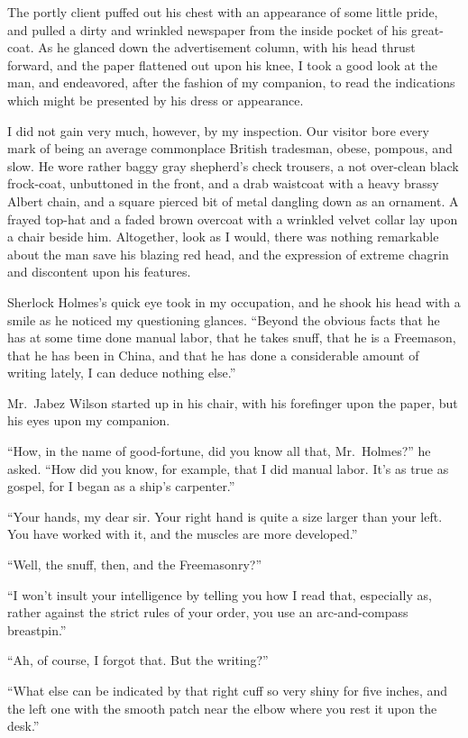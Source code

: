 The portly client puffed out his chest with an appearance of
some little pride, and pulled a dirty and wrinkled newspaper
from the inside pocket of his great-coat. As he glanced down
the advertisement column, with his head thrust forward, and
the paper flattened out upon his knee, I took a good look at
the man, and endeavored, after the fashion of my companion,
to read the indications which might be presented by his dress
or appearance.

I did not gain very much, however, by my inspection. Our
visitor bore every mark of being an average commonplace
British tradesman, obese, pompous, and slow. He wore rather
baggy gray shepherd’s check trousers, a not over-clean black
frock-coat, unbuttoned in the front, and a drab waistcoat with
a heavy brassy Albert chain, and a square pierced bit of metal
dangling down as an ornament. A frayed top-hat and a faded
brown overcoat with a wrinkled velvet collar lay upon a chair
beside him. Altogether, look as I would, there was nothing
remarkable about the man save his blazing red head, and the
expression of extreme chagrin and discontent upon his
features.

Sherlock Holmes’s quick eye took in my occupation, and he
shook his head with a smile as he noticed my questioning
glances. “Beyond the obvious facts that he has at some time
done manual labor, that he takes snuff, that he is a Freemason,
that he has been in China, and that he has done a considerable
amount of writing lately, I can deduce nothing else.”

Mr.~Jabez Wilson started up in his chair, with his forefinger
upon the paper, but his eyes upon my companion.

“How, in the name of good-fortune, did you know all that,
Mr.~Holmes?” he asked. “How did you know, for example,
that I did manual labor. It’s as true as gospel, for I began
as a ship’s carpenter.”

“Your hands, my dear sir. Your right hand is quite a size
larger than your left. You have worked with it, and the
muscles are more developed.”

“Well, the snuff, then, and the Freemasonry?”

“I won’t insult your intelligence by telling you how I read
that, especially as, rather against the strict rules of your order,
you use an arc-and-compass breastpin.”

“Ah, of course, I forgot that. But the writing?”

“What else can be indicated by that right cuff so very
shiny for five inches, and the left one with the smooth patch
near the elbow where you rest it upon the desk.”

